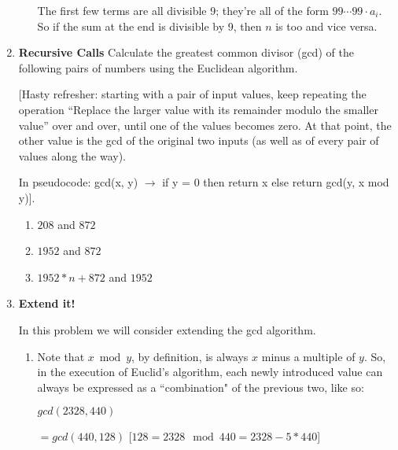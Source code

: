 \documentclass[11pt]{article}
\newif\ifsolutions
\begin{document}
\begin{enumerate}
\begin{enumerate}
       The first few terms are all divisible 9; they're all of the form $99\cdots 99 \cdot a_i$.
       So if the sum at the end is divisible by 9, then $n$ is too and vice versa. 
\end{enumerate}
\fi

\item {\bf Recursive Calls}  Calculate the greatest common divisor (gcd) of the following pairs of numbers using the Euclidean algorithm.

[Hasty refresher: starting with a pair of input values, keep repeating the operation ``Replace the larger value with its remainder modulo the smaller value'' over and over, until one of the values becomes zero. At that point, the other value is the gcd of the original two inputs (as well as of every pair of values along the way).

In pseudocode: gcd(x, y) $\rightarrow$ if y = 0 then return x else return gcd(y, x mod y)].

\begin{enumerate}
\item $208$ and $872$
\item $1952$ and $872$
\item $1952*n + 872$ and $1952$
\end{enumerate}

\ifsolutions
\textbf{Motivation for Problem:} This is supposed to be a quick refresher for the gcd algorithm, and attempts to show how gcd creates recursive calls of other gcd that we can use to shortcut.

\textbf{Solutions:} 8 for all of these. The first answer students should calculate by hand, the second answer will reduce to the first after one step, and the third answer will reduce to the second in one step.  \fi

\item {\bf Extend it!}

In this problem we will consider extending the gcd algorithm.

\begin{enumerate}

\item Note that $x \bmod y$, by definition, is always $x$ minus a multiple of $y$. So, in the execution of Euclid's algorithm, each newly introduced value can always be expressed as a ``combination" of the previous two, like so:

$ gcd(2328, 440)$ 

$= gcd(440, 128)$ [$128 = 2328 \mod{440} = 2328 - 5 * 440$] 


\end{enumerate}
\end{enumerate}
\end{document}
